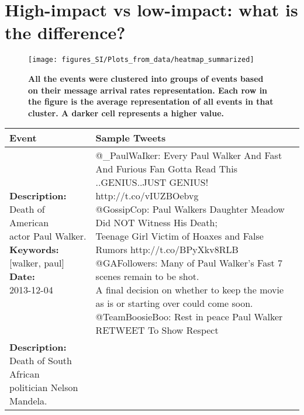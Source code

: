 \section{High-impact vs low-impact: what is the difference?}
\label{sec:diff}

\begin{figure}
  \texttt{[image: figures\_SI/Plots\_from\_data/heatmap\_summarized]}
  \caption{\textbf{All the events were clustered into groups of events
      based on their message arrival rates representation. Each row in
      the figure is the average representation of all events in that
      cluster. A darker cell represents a higher value.}}
  \label{fig:low_buzz_high_buzz}
\end{figure}
\begin{table}
  \centering
  {\scriptsize
    \begin{tabular*}{1\linewidth}{p{5cm}p{5cm}}
      \hline
      Event & Sample Tweets \\
      \hline
      \pbox{20cm}{\textbf{Description:}\\ Death of American\\actor Paul Walker. \vspace{.1cm}\\
        \textbf{Keywords:}\\ {[}walker, paul{]}\vspace{.1cm}\\
        \textbf{Date:}\\ 2013-12-04}
      & \pbox{20cm}{
        @\_PaulWaIker: Every Paul Walker And Fast And Furious Fan Gotta Read This\\..GENIUS..JUST GENIUS! http://t.co/vIUZBOebvg\vspace{.1cm}\\
        @GossipCop: Paul Walkers Daughter Meadow Did NOT Witness His Death;\\ Teenage Girl Victim of Hoaxes and False Rumors http://t.co/BPyXkv8RLB\vspace{.1cm}\\
        @GAFollowers: Many of Paul Walker's Fast 7 scenes remain to be shot.\\ A final decision on whether to keep the movie as is or starting over could come soon.\vspace{.1cm}\\
        @TeamBoosieBoo: Rest in peace Paul Walker  RETWEET To Show Respect
      }
      \\
     \hline
      \pbox{20cm}{\textbf{Description:}\\ Death of South African\\ politician Nelson Mandela. \vspace{.1cm}\\
}
\end{tabular*}}
\end{table}
